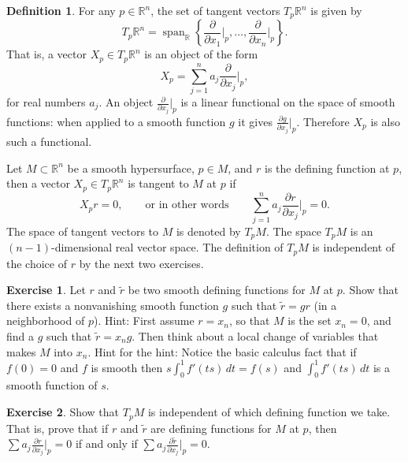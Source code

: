 \documentclass[12pt,openany]{book}
\newcommand{\R}{{\mathbb{R}}}
\theoremstyle{plain}
\theoremstyle{remark}
\theoremstyle{definition}
\newtheorem{defn}[thm]{Definition}
\newenvironment{exbox}{%
    \def\FrameCommand{\vrule width 1pt \relax\hspace {10pt}}%
    \MakeFramed {\advance \hsize -\width \FrameRestore }%
}{%
    \endMakeFramed
}
\theoremstyle{exercise}
\newtheorem{exercise}{Exercise}[section]
\theoremstyle{example}
\begin{document}
\begin{defn}
For any $p \in \R^n$, the set of tangent vectors $T_p \R^n$ is given by
\begin{equation*}
T_p \R^n = \operatorname{span}_{\R} \left\{
\frac{\partial}{\partial x_1}\Big|_p,
\ldots,
\frac{\partial}{\partial x_n}\Big|_p \right\} .
\end{equation*}
That is, a vector $X_p \in T_p \R^n$ is an object of the form
\begin{equation*}
X_p = \sum_{j=1}^n a_j 
\frac{\partial}{\partial x_j}\Big|_p ,
\end{equation*}
for real numbers $a_j$.
An object $\frac{\partial}{\partial x_j}\Big|_p$ is a linear functional
on the space of smooth functions:
when applied to a smooth function $g$ it gives
$\frac{\partial g}{\partial x_j} \Big|_p$.  Therefore $X_p$ is also such a
functional.

Let $M \subset \R^n$ be a smooth hypersurface, %
$p \in M$, and $r$ is the defining function at $p$,
then a vector $X_p \in T_p \R^n$ is tangent 
to $M$ at $p$ if
\begin{equation*}
X_p r = 0, \qquad \text{or in other words} \qquad
\sum_{j=1}^n a_j \frac{\partial r}{\partial x_j} \Big|_p = 0 .
\end{equation*}
The space of tangent vectors to $M$ is denoted by $T_p M$.  The
space $T_pM$ is an $(n-1)$-dimensional real vector space.  
The definition of $T_pM$ is independent of the choice of $r$ by the next two
exercises.

\begin{exbox}
\begin{exercise}
Let $r$ and $\tilde{r}$ be two smooth defining functions for $M$ at $p$.
Show that there exists a nonvanishing smooth function $g$ such that
$\tilde{r} = g r$ (in a neighborhood of $p$).
Hint: First assume $r=x_n$, so that $M$ is the set $x_n = 0$,
and find a $g$ such that $\tilde{r} = x_n g$.  Then think
about a local change of variables that makes $M$ into $x_n$.  Hint for the
hint: Notice
the basic calculus fact that if $f(0) = 0$ and $f$ is smooth then
$s \int_0^1 f'(ts) \,dt = f(s)$
and $\int_0^1 f'(ts) \,dt$ is a smooth function of $s$.
\end{exercise}

\begin{exercise}
Show that $T_pM$ is independent of which defining function we take.  That
is,
prove that if $r$ and $\tilde{r}$ are defining functions for $M$ at $p$, then
$\sum a_j \frac{\partial r}{\partial x_j} \Big|_p = 0$
if and only if
$\sum a_j \frac{\partial \tilde{r}}{\partial x_j} \Big|_p = 0$.
\end{exercise}
\end{exbox}


\end{defn}
\end{document}
